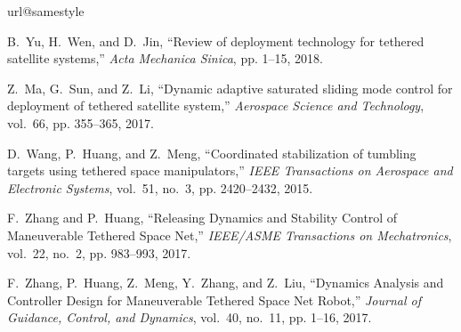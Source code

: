 \documentclass[10pt,final,journal]{IEEEtran}
\begin{document}
%
%
\begin{thebibliography}{10}
	\providecommand{\url}[1]{#1}
	\csname url@samestyle\endcsname
	\providecommand{\newblock}{\relax}
	\providecommand{\bibinfo}[2]{#2}
	\providecommand{\BIBentrySTDinterwordspacing}{\spaceskip=0pt\relax}
	\providecommand{\BIBentryALTinterwordstretchfactor}{4}
	\providecommand{\BIBentryALTinterwordspacing}{\spaceskip=\fontdimen2\font plus
	\BIBentryALTinterwordstretchfactor\fontdimen3\font minus
		\fontdimen4\font\relax}
	\providecommand{\BIBforeignlanguage}[2]{{%
	\expandafter\ifx\csname l@#1\endcsname\relax
	\typeout{** WARNING: IEEEtran.bst: No hyphenation pattern has been}%
	\typeout{** loaded for the language `#1'. Using the pattern for}%
	\typeout{** the default language instead.}%
	\else
	\language=\csname l@#1\endcsname
	\fi
	#2}}
	\providecommand{\BIBdecl}{\relax}
	\BIBdecl
	
	B.~Yu, H.~Wen, and D.~Jin, ``Review of deployment technology for tethered
		satellite systems,'' \emph{Acta Mechanica Sinica}, pp. 1--15, 2018.
	
	Z.~Ma, G.~Sun, and Z.~Li, ``Dynamic adaptive saturated sliding mode control for
		deployment of tethered satellite system,'' \emph{Aerospace Science and
		Technology}, vol.~66, pp. 355--365, 2017.
	
	D.~Wang, P.~Huang, and Z.~Meng, ``Coordinated stabilization of tumbling targets
		using tethered space manipulators,'' \emph{IEEE Transactions on Aerospace and
		Electronic Systems}, vol.~51, no.~3, pp. 2420--2432, 2015.
	
	F.~Zhang and P.~Huang, ``{Releasing Dynamics and Stability Control of
		Maneuverable Tethered Space Net},'' \emph{IEEE/ASME Transactions on
		Mechatronics}, vol.~22, no.~2, pp. 983--993, 2017.
	
	F.~Zhang, P.~Huang, Z.~Meng, Y.~Zhang, and Z.~Liu, ``{Dynamics Analysis and
		Controller Design for Maneuverable Tethered Space Net Robot},'' \emph{Journal
		of Guidance, Control, and Dynamics}, vol.~40, no.~11, pp. 1--16, 2017.
	

\end{thebibliography}
\end{document}
